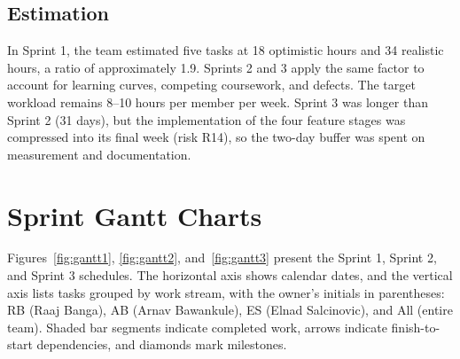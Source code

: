 \documentclass[12pt,letterpaper]{article}
\begin{document}
\subsection{Estimation}
In Sprint 1, the team estimated five tasks at 18 optimistic hours and 34 realistic
hours, a ratio of approximately 1.9. Sprints 2 and 3 apply the same factor to account
for learning curves, competing coursework, and defects. The target workload remains
8--10 hours per member per week. Sprint 3 was longer than Sprint 2 (31 days), but the
implementation of the four feature stages was compressed into its final week
(risk R14), so the two-day buffer was spent on measurement and documentation.

\section{Sprint Gantt Charts}
Figures~\ref{fig:gantt1}, \ref{fig:gantt2}, and~\ref{fig:gantt3} present the
Sprint 1, Sprint 2, and Sprint 3 schedules. The horizontal axis shows calendar dates, and the vertical axis lists tasks
grouped by work stream, with the owner's initials in parentheses: RB (Raaj Banga), AB
(Arnav Bawankule), ES (Elnad Salcinovic), and All (entire team). Shaded bar segments
indicate completed work, arrows indicate finish-to-start dependencies, and diamonds
mark milestones.
\end{document}
